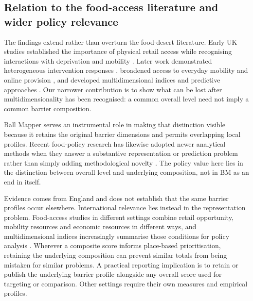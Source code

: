 \documentclass[11pt,a4paper]{article}
\begin{document}
\subsection{Relation to the food-access literature and wider policy relevance}
The findings extend rather than overturn the food-desert literature. Early UK studies established the importance of physical retail access while recognising interactions with deprivation and mobility \citep{Wrigley2002,Whelan2002,Wrigley2003}. Later work demonstrated heterogeneous intervention responses \citep{GillRudkin2014,FreireRudkin2019}, broadened access to everyday mobility and online provision \citep{Shannon2016,Newing2022,Janatabadi2024}, and developed multidimensional indices and predictive approaches \citep{Amin2021,Beydoun2026}. Our narrower contribution is to show what can be lost after multidimensionality has been recognised: a common overall level need not imply a common barrier composition.

Ball Mapper serves an instrumental role in making that distinction visible because it retains the original barrier dimensions and permits overlapping local profiles. Recent food-policy research has likewise adopted newer analytical methods when they answer a substantive representation or prediction problem rather than simply adding methodological novelty \citep{Hossain2019,Amin2021,Sartori2015}. The policy value here lies in the distinction between overall level and underlying composition, not in BM as an end in itself.

Evidence comes from England and does not establish that the same barrier profiles occur elsewhere. International relevance lies instead in the representation problem. Food-access studies in different settings combine retail opportunity, mobility resources and economic resources in different ways, and multidimensional indices increasingly summarise those conditions for policy analysis \citep{Amin2021,Cuffey2023,Pettigrew2024}. Wherever a composite score informs place-based prioritisation, retaining the underlying composition can prevent similar totals from being mistaken for similar problems. A practical reporting implication is to retain or publish the underlying barrier profile alongside any overall score used for targeting or comparison. Other settings require their own measures and empirical profiles.
\end{document}
